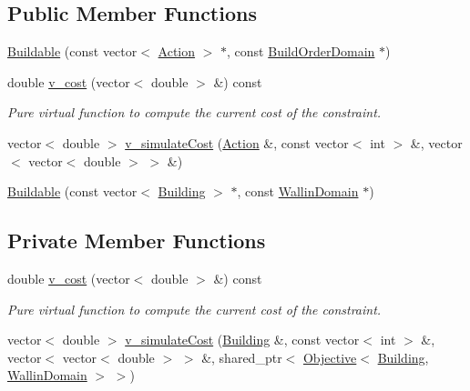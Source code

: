 \subsection*{Public Member Functions}
\begin{DoxyCompactItemize}
\item 
\hyperlink{classghost_1_1Buildable_a81873d4e7eb020f66d16c3024b3c52cd}{Buildable} (const vector$<$ \hyperlink{classghost_1_1Action}{Action} $>$ $\ast$, const \hyperlink{classghost_1_1BuildOrderDomain}{Build\-Order\-Domain} $\ast$)
\item 
double \hyperlink{classghost_1_1Buildable_a584162de15bdeb91c7f9a0d0a0fa3c87}{v\-\_\-cost} (vector$<$ double $>$ \&) const 
\begin{DoxyCompactList}\small\item\em Pure virtual function to compute the current cost of the constraint. \end{DoxyCompactList}\item 
vector$<$ double $>$ \hyperlink{classghost_1_1Buildable_a0d33808d13f87e9ff04589bb43d56fa8}{v\-\_\-simulate\-Cost} (\hyperlink{classghost_1_1Action}{Action} \&, const vector$<$ int $>$ \&, vector$<$ vector$<$ double $>$ $>$ \&)
\item 
\hyperlink{classghost_1_1Buildable_afb25530b221922dd29a0a5bd7cdd68c6}{Buildable} (const vector$<$ \hyperlink{classghost_1_1Building}{Building} $>$ $\ast$, const \hyperlink{classghost_1_1WallinDomain}{Wallin\-Domain} $\ast$)
\end{DoxyCompactItemize}
\subsection*{Private Member Functions}
\begin{DoxyCompactItemize}
\item 
double \hyperlink{classghost_1_1Buildable_a584162de15bdeb91c7f9a0d0a0fa3c87}{v\-\_\-cost} (vector$<$ double $>$ \&) const 
\begin{DoxyCompactList}\small\item\em Pure virtual function to compute the current cost of the constraint. \end{DoxyCompactList}\item 
vector$<$ double $>$ \hyperlink{classghost_1_1Buildable_a8b2f97c002509cd35846af837405fc1e}{v\-\_\-simulate\-Cost} (\hyperlink{classghost_1_1Building}{Building} \&, const vector$<$ int $>$ \&, vector$<$ vector$<$ double $>$ $>$ \&, shared\-\_\-ptr$<$ \hyperlink{classghost_1_1Objective}{Objective}$<$ \hyperlink{classghost_1_1Building}{Building}, \hyperlink{classghost_1_1WallinDomain}{Wallin\-Domain} $>$ $>$)
\end{DoxyCompactItemize}
